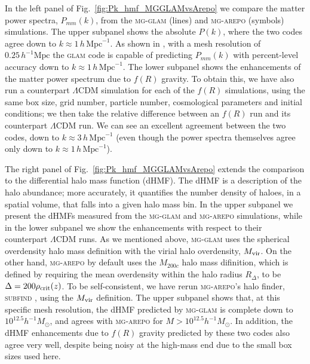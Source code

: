 In the left panel of Fig.~\ref{fig:Pk_hmf_MGGLAMvsArepo} we compare the matter power spectra, $P_{mm}(k)$, from the \textsc{mg-glam} (lines) and \textsc{mg-arepo} (symbols) simulations. The upper subpanel shows the absolute $P(k)$, where the two codes agree down to $k \approx 1 \, h\,\mathrm{Mpc}^{-1}$. As shown in \cite{Klypin:2017iwu}, with a mesh resolution of $0.25 \, h^{-1} \mathrm{Mpc}$ the \textsc{glam} code is capable of predicting $P_{mm}(k)$ with percent-level accuracy down to $k \approx 1 \, h\,\mathrm{Mpc}^{-1}$. The lower subpanel shows the enhancements of the matter power spectrum due to $f(R)$ gravity. To obtain this, we have also run a counterpart $\Lambda$CDM simulation for each of the $f(R)$ simulations, using the same box size, grid number, particle number, cosmological parameters and initial conditions; we then take the relative difference between an $f(R)$ run and its counterpart $\Lambda$CDM run. We can see an excellent agreement between the two codes, down to $k \approx 3 \, h\,\mathrm{Mpc}^{-1}$ (even though the power spectra themselves agree only down to $k \approx 1 \, h\,\mathrm{Mpc}^{-1}$).  

The right panel of Fig.~\ref{fig:Pk_hmf_MGGLAMvsArepo} extends the comparison to the differential halo mass function (dHMF). The dHMF is a description of the halo abundance; more accurately, it quantifies the number density of haloes, in a spatial volume, that falls into a given halo mass bin. In the upper subpanel we present the dHMFs measured from the \textsc{mg-glam} and \textsc{mg-arepo} simulations, while in the lower subpanel we show the enhancements with respect to their counterpart $\Lambda$CDM runs. As we mentioned above, \textsc{mg-glam} uses the spherical overdensity halo mass definition with the virial halo overdensity, $M_{\rm vir}$. On the other hand, \textsc{mg-arepo} by default uses the $M_{200c}$ halo mass difinition, which is defined by requiring the mean overdensity within the halo radius $R_\Delta$, to be $\Delta=200\rho_{\rm crit}(z)$. To be self-consistent, we have rerun \textsc{mg-arepo}'s halo finder, \textsc{subfind} \cite{Springel2001}, using the $M_{\rm vir}$ definition. %
The upper subpanel shows that, at this specific mesh resolution, the dHMF predicted by \textsc{mg-glam} is complete down to $10^{12.5}h^{-1}M_\odot$, and agrees with \textsc{mg-arepo} for $M>10^{12.5}h^{-1}M_\odot$. In addition, the dHMF enhancements due to $f(R)$ gravity predicted by these two codes also agree very well, despite being noisy at the high-mass end due to the small box sizes used here.

